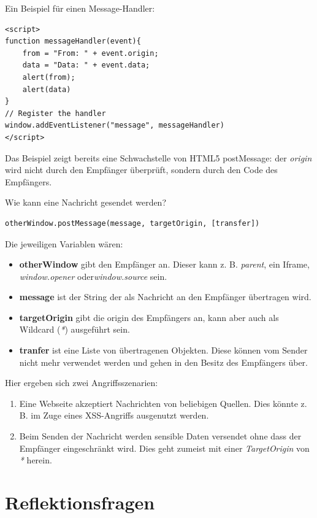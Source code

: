 Ein Beispiel für einen Message-Handler:

\begin{verbatim}
<script>
function messageHandler(event){
	from = "From: " + event.origin;
	data = "Data: " + event.data;
	alert(from);
	alert(data)
}
// Register the handler
window.addEventListener("message", messageHandler)
</script>
\end{verbatim}

Das Beispiel zeigt bereits eine Schwachstelle von HTML5 postMessage: der \textit{origin} wird nicht durch den Empfänger überprüft, sondern durch den Code des Empfängers.

Wie kann eine Nachricht gesendet werden?

\begin{verbatim}
otherWindow.postMessage(message, targetOrigin, [transfer])
\end{verbatim}

Die jeweiligen Variablen wären:

\begin{itemize}
\item \textbf{otherWindow} gibt den Empfänger an. Dieser kann z. B. \textit{parent}, ein Iframe, \textit{window.opener} oder\textit{window.source} sein.
\item \textbf{message} ist der String der als Nachricht an den Empfänger übertragen wird.
\item \textbf{targetOrigin} gibt die origin des Empfängers an, kann aber auch als Wildcard (\textit{*}) ausgeführt sein.
\item \textbf{tranfer} ist eine Liste von übertragenen Objekten. Diese können vom Sender nicht mehr verwendet werden und gehen in den Besitz des Empfängers über.
\end{itemize}

Hier ergeben sich zwei Angriffsszenarien:

\begin{enumerate}
	\item Eine Webseite akzeptiert Nachrichten von beliebigen Quellen. Dies könnte z. B. im Zuge eines XSS-Angriffs ausgenutzt werden.
	\item Beim Senden der Nachricht werden sensible Daten versendet ohne dass der Empfänger eingeschränkt wird. Dies geht zumeist mit einer \textit{TargetOrigin} von \textit{*} herein.
\end{enumerate}

\section{Reflektionsfragen}


